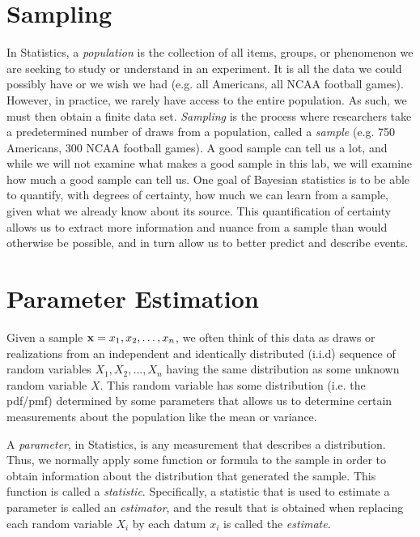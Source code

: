 \label{lab:Sampling}

\section*{Sampling}
In Statistics, a \emph{population} is the collection of all items, groups, or phenomenon we are seeking to study or understand in an experiment.
It is all the data we could possibly have or we wish we had (e.g. all Americans, all NCAA football games).
However, in practice, we rarely have access to the entire population. As such, we must then obtain a finite data set.
\emph{Sampling} is the process where researchers take a predetermined number of draws from a population, called a \emph{sample} (e.g. 750 Americans, 300 NCAA football games).
A good sample can tell us a lot, and while we will not examine what makes a good sample in this lab, we will examine how much a good sample can tell us.
One goal of Bayesian statistics is to be able to quantify, with degrees of certainty, how much we can learn from a sample, given what we already know about its source.
This quantification of certainty allows us to extract more information and nuance from a sample than would otherwise be possible, and in turn allow us to better predict and describe events.

\section*{Parameter Estimation}
Given a sample $\mathbf{x}=x_1,x_2,\ldots,x_n$, we often think of this data as draws or realizations from an independent and identically distributed (i.i.d) sequence of random variables $X_1,X_2,...,X_n$ having the same distribution as some unknown random variable $X$.
This random variable has some distribution (i.e. the pdf/pmf) determined by some parameters that allows us to determine certain measurements about the population like the mean or variance.

A \emph{parameter}, in Statistics, is any measurement that describes a distribution.
Thus, we normally apply some function or formula to the sample in order to obtain information about the distribution that generated the sample.
This function is called a \emph{statistic}.
Specifically, a statistic that is used to estimate a parameter is called an \emph{estimator}, and the result that is obtained when replacing each random variable $X_i$ by each datum $x_i$ is called the \emph{estimate}.

